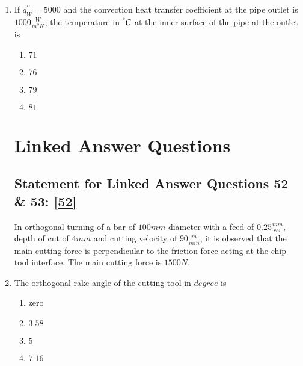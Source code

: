 \documentclass[journal]{IEEEtran}
\numberwithin{equation}{enumi}
\numberwithin{figure}{enumi}
\begin{document}
\begin{enumerate}
    \item
    If $q_W^{\prime\prime} = 5000$ and the convection heat transfer coefficient at the pipe outlet is $1000\frac{W}{m^2K}$, the temperature in $^\degree C$ at the inner surface of the pipe at the outlet is \label{51}
    \hfill{}

    \begin{multicols}{4}
        \begin{enumerate}
            \item $71$
            \item $76$
            \item $79$
            \item $81$
        \end{enumerate}
    \end{multicols}

    \section{Linked Answer Questions}
    \subsection{Statement for Linked Answer Questions 52 \& 53: \ref{52}}
        
    In orthogonal turning of a bar of $100 mm$ diameter with a feed of $0.25 \frac{mm}{rev}$, depth of cut of $4 mm$ and cutting velocity of $90 \frac{m}{min}$, it is observed that the main  cutting force is perpendicular to the friction force acting at the chip-tool interface. The main  cutting force is $1500 N$.\\

    \item 
    The orthogonal rake angle of the cutting tool in $degree$ is \label{52}
    \hfill{}
    \begin{multicols}{4}
        \begin{enumerate}
            \item zero
            \item $3.58$
            \item $5$
            \item $7.16$
        \end{enumerate}
    \end{multicols}

\end{enumerate}
\end{document}
